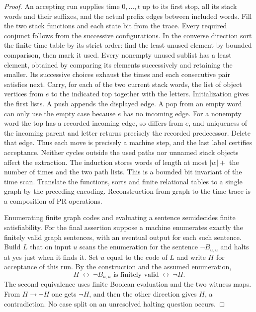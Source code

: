 \begin{proof}
An accepting run supplies time $0,\ldots,t$ up to its first stop, all its stack words and their suffixes, and the actual prefix edges between included words. Fill the two stack functions and each state bit from the trace. Every required conjunct follows from the successive configurations. In the converse direction sort the finite time table by its strict order: find the least unused element by bounded comparison, then mark it used. Every nonempty unused sublist has a least element, obtained by comparing its elements successively and retaining the smaller. Its successive choices exhaust the times and each consecutive pair satisfies $\mathrm{next}$. Carry, for each of the two current stack words, the list of object vertices from $e$ to the indicated top together with the letters. Initialization gives the first lists. A push appends the displayed edge. A pop from an empty word can only use the empty case because $e$ has no incoming edge. For a nonempty word the top has a recorded incoming edge, so differs from $e$, and uniqueness of the incoming parent and letter returns precisely the recorded predecessor. Delete that edge. Thus each move is precisely a machine step, and the last label certifies acceptance. Neither cycles outside the used paths nor unnamed stack objects affect the extraction. The induction stores words of length at most $|w|+$ the number of times and the two path lists. This is a bounded bit invariant of the time scan. Translate the functions, sorts and finite relational tables to a single graph by the preceding encoding. Reconstruction from graph to the time trace is a composition of PR operations.

Enumerating finite graph codes and evaluating a sentence semidecides finite satisfiability. For the final assertion suppose a machine enumerates exactly the finitely valid graph sentences, with an eventual output for each such sentence. Build $L$ that on input $u$ scans the enumeration for the sentence $\neg B_{u,u}$ and halts at yes just when it finds it. Set $u$ equal to the code of $L$ and write $H$ for acceptance of this run. By the construction and the assumed enumeration,
\[
 H\ \longleftrightarrow\ \neg B_{u,u}\text{ is finitely valid}
       \ \longleftrightarrow\ \neg H .
\]
The second equivalence uses finite Boolean evaluation and the two witness maps. From $H\to\neg H$ one gets $\neg H$, and then the other direction gives $H$, a contradiction. No case split on an unresolved halting question occurs.
\end{proof}
